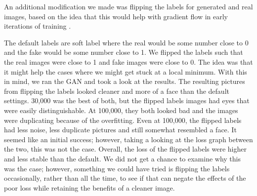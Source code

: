 \documentclass{article} %
\begin{document}
An additional modification we made was flipping the labels for generated and real images, based on the idea that this would help with gradient flow in early iterations of training \cite{ganTrainTips}.

The default labels are soft label where the real would be some number close to 0 and the fake would be some number close to 1. We flipped the labels such that the real images were close to 1 and fake images were close to 0. The idea was that it might help the cases where we might get stuck at a local minimum. With this in mind, we ran the GAN and took a look at the results. The resulting pictures from flipping the labels looked cleaner and more of a face than the default settings. 30,000 was the best of both, but the flipped labels images had eyes that were easily distinguishable. At 100,000, they both looked bad and the images were duplicating because of the overfitting. Even at 100,000, the flipped labels had less noise, less duplicate pictures and still somewhat resembled a face. It seemed like an initial success; however, taking a looking at the loss graph between the two, this was not the case. Overall, the loss of the flipped labels were higher and less stable than the default. We did not get a chance to examine why this was the case; however, something we could have tried is flipping the labels occasionally, rather than all the time, to see if that can negate the effects of the poor loss while retaining the benefits of a cleaner image. 
\end{document}

